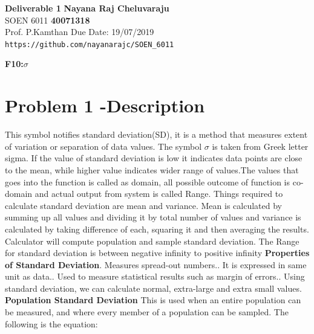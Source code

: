 \documentclass[a4paper,12pt]{article}
\begin{document}
\begin{titlepage}
\noindent
\large\textbf{Deliverable 1} \hfill \textbf{Nayana Raj Cheluvaraju} \\
\normalsize SOEN 6011 \hfill \textbf{40071318} \\
Prof. P.Kamthan \hfill Due Date: 19/07/2019 \\
\hspace*{\fill}\texttt{{https://github.com/}{nayanarajc/SOEN\_6011}}\\

    \begin{center}
        \large\textbf{F10:$\sigma$}
    \end{center}

\section{Problem 1 -Description}
This symbol notifies standard deviation(SD), it is a method that measures extent of variation or separation of data values. The symbol $\sigma$  is taken from Greek letter sigma. If the value of standard deviation is low it indicates data points are close to the mean, while higher value indicates wider range of values.The values that goes into the function is called as domain, all possible outcome of function is co-domain and actual output from system is called Range. Things required to calculate standard deviation are mean and variance. Mean is calculated by summing up all values and dividing it by total number of values and variance is calculated by taking difference of each, squaring it and then averaging the results. Calculator will compute population and sample standard deviation.\newline
The Range for standard deviation is between negative infinity to positive infinity\newline
\textbf{Properties of Standard Deviation}.	Measures spread-out numbers..	It is expressed in same unit as data..	Used to measure statistical results such as margin of errors..	Using standard deviation, we can calculate normal, extra-large and extra small values.
\newline
\newline
\textbf{Population Standard Deviation}
\newline
This is used when an entire population can be measured, and where every member of a population can be sampled. The following is the equation:

\end{titlepage}
\end{document}
